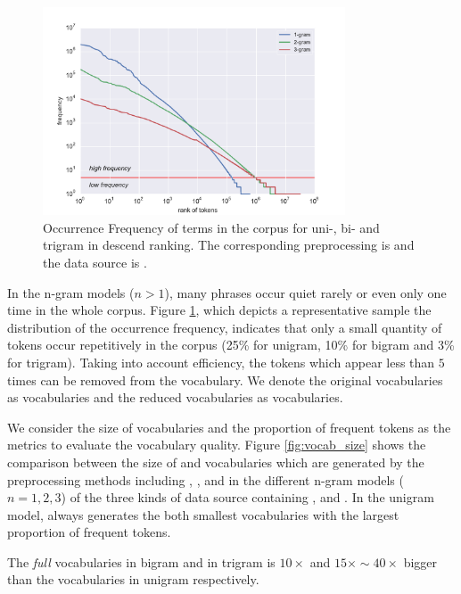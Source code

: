 \begin{figure}[!htb]
    \centering
    \includegraphics[width=0.8\textwidth]{fig/freqdist}
    \caption{Occurrence Frequency of terms in the corpus for uni-, bi- and trigram in descend ranking. The corresponding preprocessing is \iSE{} and the data source is \icontent{}.}
    \label{fig:freqdist}
\end{figure}

In the n-gram models ($n > 1$), many phrases occur quiet rarely or even only one time in the whole corpus. Figure \ref{fig:freqdist}, which depicts a representative sample the distribution of the occurrence frequency, indicates that only a small quantity of tokens occur repetitively in the corpus (25\% for unigram, 10\% for bigram and 3\% for trigram). Taking into account efficiency, the tokens which appear less than $5$ times can be removed from the vocabulary. We denote the original vocabularies as \ifull{} vocabularies and the reduced vocabularies as \icommon{} vocabularies. 


We consider the size of \ifull{} vocabularies and the proportion of frequent tokens as the metrics to evaluate the vocabulary quality. Figure \ref{fig:vocab_size} shows the comparison between the size of \ifull{} and \icommon{} vocabularies which are generated by the preprocessing methods including \iSP{}, \iSE{}, \iST{} and \iSS{} in the different n-gram models ($n=1, 2, 3$) of the three kinds of data source containing \icontent{}, \ititle{} and \isummary{}. In the unigram model, \iSS{} always generates the both smallest vocabularies with the largest proportion of frequent tokens. 

The \textit{full} vocabularies in bigram and in trigram is $10\times$ and $15\times \sim 40\times$ bigger than the vocabularies in unigram respectively. 

